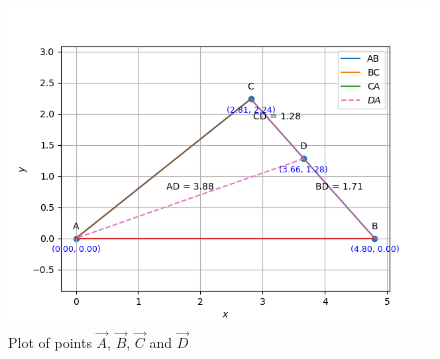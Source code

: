 \documentclass[journal]{IEEEtran}
\begin{document}
		\begin{figure}[h!]
                \centering
               \includegraphics[width=0.7\linewidth]{figs/Fig1.png}
			\caption{Plot of points $\vec{A}$, $\vec{B}$, $\vec{C}$ and $\vec{D}$}
               
               \end{figure}
\end{document}
